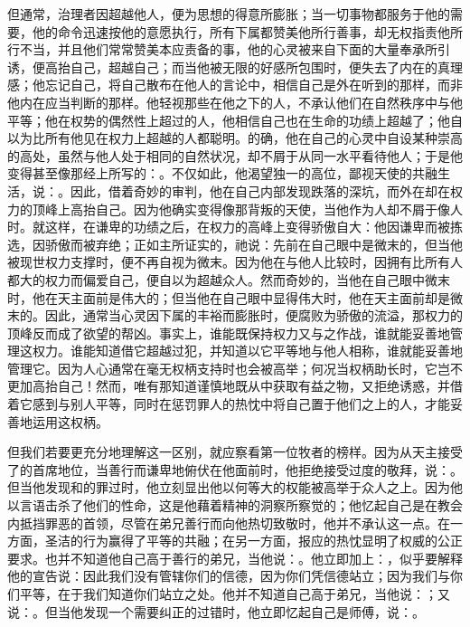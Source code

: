 但通常，治理者因超越他人，便为思想的得意所膨胀；当一切事物都服务于他的需要，他的命令迅速按他的意愿执行，所有下属都赞美他所行善事，却无权指责他所行不当，并且他们常常赞美本应责备的事，他的心灵被来自下面的大量奉承所引诱，便高抬自己，超越自己；而当他被无限的好感所包围时，便失去了内在的真理感；他忘记自己，将自己散布在他人的言论中，相信自己是外在听到的那样，而非他内在应当判断的那样。他轻视那些在他之下的人，不承认他们在自然秩序中与他平等；他在权势的偶然性上超过的人，他相信自己也在生命的功绩上超越了；他自以为比所有他见在权力上超越的人都聪明。的确，他在自己的心灵中自设某种崇高的高处，虽然与他人处于相同的自然状况，却不屑于从同一水平看待他人；于是他变得甚至像那经上所写的：。不仅如此，他渴望独一的高位，鄙视天使的共融生活，说：。因此，借着奇妙的审判，他在自己内部发现跌落的深坑，而外在却在权力的顶峰上高抬自己。因为他确实变得像那背叛的天使，当他作为人却不屑于像人时。就这样，在谦卑的功绩之后，在权力的高峰上变得骄傲自大：他因谦卑而被拣选，因骄傲而被弃绝；正如主所证实的，祂说：先前在自己眼中是微末的，但当他被现世权力支撑时，便不再自视为微末。因为他在与他人比较时，因拥有比所有人都大的权力而偏爱自己，便自以为超越众人。然而奇妙的，当他在自己眼中微末时，他在天主面前是伟大的；但当他在自己眼中显得伟大时，他在天主面前却是微末的。因此，通常当心灵因下属的丰裕而膨胀时，便腐败为骄傲的流溢，那权力的顶峰反而成了欲望的帮凶。事实上，谁能既保持权力又与之作战，谁就能妥善地管理这权力。谁能知道借它超越过犯，并知道以它平等地与他人相称，谁就能妥善地管理它。因为人心通常在毫无权柄支持时也会被高举；何况当权柄助长时，它岂不更加高抬自己！然而，唯有那知道谨慎地既从中获取有益之物，又拒绝诱惑，并借着它感到与别人平等，同时在惩罚罪人的热忱中将自己置于他们之上的人，才能妥善地运用这权柄。\par

但我们若要更充分地理解这一区别，就应察看第一位牧者的榜样。因为从天主接受了的首席地位，当善行而谦卑地俯伏在他面前时，他拒绝接受过度的敬拜，说：。但当他发现和的罪过时，他立刻显出他以何等大的权能被高举于众人之上。因为他以言语击杀了他们的性命，这是他藉着精神的洞察所察觉的；他忆起自己是在教会内抵挡罪恶的首领，尽管在弟兄善行而向他热切致敬时，他并不承认这一点。在一方面，圣洁的行为赢得了平等的共融；在另一方面，报应的热忱显明了权威的公正要求。也并不知道他自己高于善行的弟兄，当他说：。他立即加上：，似乎要解释他的宣告说：因此我们没有管辖你们的信德，因为你们凭信德站立；因为我们与你们平等，在于我们知道你们站立之处。他并不知道自己高于弟兄，当他说：；又说：。但当他发现一个需要纠正的过错时，他立即忆起自己是师傅，说：。\par

